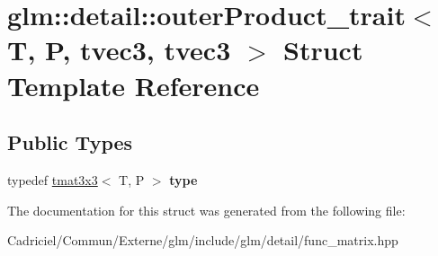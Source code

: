 \hypertarget{structglm_1_1detail_1_1outer_product__trait_3_01_t_00_01_p_00_01tvec3_00_01tvec3_01_4}{}\section{glm\+:\+:detail\+:\+:outer\+Product\+\_\+trait$<$ T, P, tvec3, tvec3 $>$ Struct Template Reference}
\label{structglm_1_1detail_1_1outer_product__trait_3_01_t_00_01_p_00_01tvec3_00_01tvec3_01_4}
\subsection*{Public Types}
\begin{DoxyCompactItemize}
\item 
typedef \hyperlink{structglm_1_1detail_1_1tmat3x3}{tmat3x3}$<$ T, P $>$ {\bfseries type}\hypertarget{structglm_1_1detail_1_1outer_product__trait_3_01_t_00_01_p_00_01tvec3_00_01tvec3_01_4_ac6a4ba81935840a9b4e4603f0bc0e222}{}\label{structglm_1_1detail_1_1outer_product__trait_3_01_t_00_01_p_00_01tvec3_00_01tvec3_01_4_ac6a4ba81935840a9b4e4603f0bc0e222}

\end{DoxyCompactItemize}


The documentation for this struct was generated from the following file\+:\begin{DoxyCompactItemize}
\item 
Cadriciel/\+Commun/\+Externe/glm/include/glm/detail/func\+\_\+matrix.\+hpp\end{DoxyCompactItemize}
